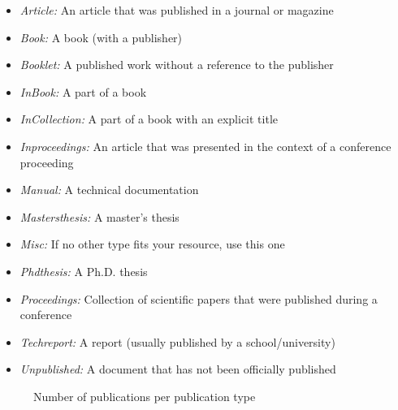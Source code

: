 \begin{itemize}[noitemsep]
	\item \textit{Article:} An article that was published in a journal or magazine
	\item \textit{Book:} A book (with a publisher)
	\item \textit{Booklet:} A published work without a reference to the publisher 
	\item \textit{InBook:} A part of a book 
	\item \textit{InCollection:} A part of a book with an explicit title
	\item \textit{Inproceedings:} An article that was presented in the context of a conference proceeding 
	\item \textit{Manual:} A technical documentation 
	\item \textit{Mastersthesis:} A master’s thesis
	\item \textit{Misc:} If no other type fits your resource, use this one 
	\item \textit{Phdthesis:} A Ph.D. thesis 
	\item \textit{Proceedings:} Collection of scientific papers that were published during a conference 
	\item \textit{Techreport:} A report (usually published by a school/university) 
	\item \textit{Unpublished:} A document that has not been officially published
\end{itemize}
\begin{figure}[!ht]
	\centering
	\caption{Number of publications per publication type} 	
	\label{graph:rq2_publication_type}
\end{figure}


\clearpage

